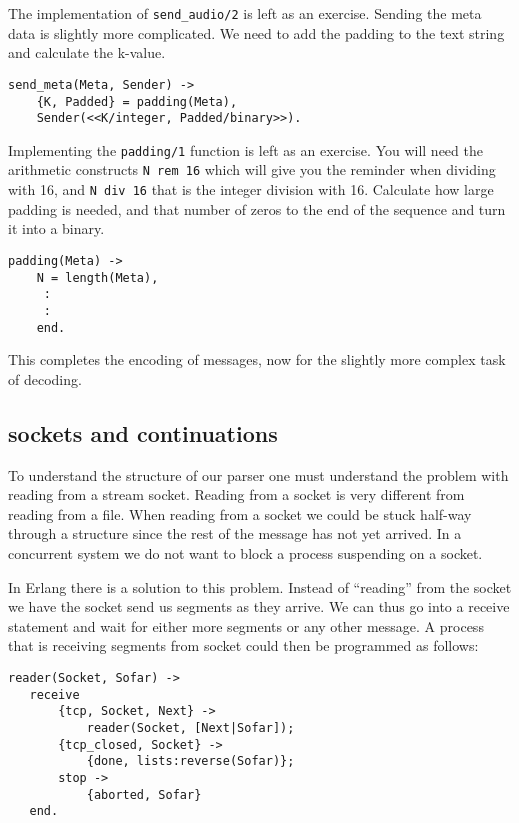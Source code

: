 \documentclass[a4paper,11pt]{article}
\begin{document}
The implementation of {\tt send\_audio/2} is left as an
exercise. Sending the meta data is slightly more complicated. We need
to add the padding to the text string and calculate the k-value.

\begin{verbatim}
send_meta(Meta, Sender) ->
    {K, Padded} = padding(Meta),
    Sender(<<K/integer, Padded/binary>>).
\end{verbatim}

Implementing the {\tt padding/1} function is left as an exercise. You
will need the arithmetic constructs {\tt N rem 16} which will give you
the reminder when dividing with 16, and {\tt N div 16} that is the
integer division with 16. Calculate how large padding is needed,
and that number of zeros to the end of the sequence and turn it into a binary.

\begin{verbatim}
padding(Meta) ->
    N = length(Meta),
     :
     :
    end.
\end{verbatim}

This completes the encoding of messages, now for the slightly more
complex task of decoding. 

\subsection{sockets and continuations}

To understand the structure of our parser one must understand the
problem with reading from a stream socket. Reading from a socket is
very different from reading from a file. When reading from a socket we
could be stuck half-way through a structure since the rest of the
message has not yet arrived. In a concurrent system we do not want to
block a process suspending on a socket. 

In Erlang there is a solution to this problem. Instead of ``reading''
from the socket we have the socket send us segments as they arrive. We
can thus go into a receive statement and wait for either more segments
or any other message. A process that is receiving segments from socket
could then be programmed as follows:

\begin{verbatim}
reader(Socket, Sofar) ->
   receive
       {tcp, Socket, Next} ->
           reader(Socket, [Next|Sofar]);
       {tcp_closed, Socket} ->
           {done, lists:reverse(Sofar)};
       stop ->
           {aborted, Sofar}
   end.
\end{verbatim}
           
\end{document}
